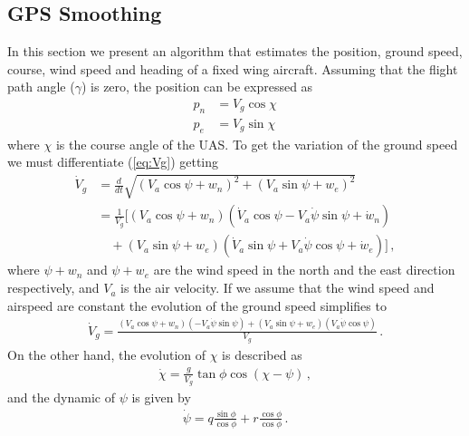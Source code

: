 \subsection{GPS Smoothing}
In this section we present an algorithm that estimates the position, ground speed, course, wind speed and heading of a fixed wing aircraft. Assuming that the flight path angle ($\gamma$) is zero, the position can be expressed as
\begin{align*}
p_n&=V_g\cos\chi\\
p_e&=V_g\sin\chi\,
\end{align*}
where $\chi$ is the course angle of the UAS.
To get the variation of the ground speed we must differentiate (\ref{eq:Vg}) getting
\begin{align*}
\dot{V}_g &= \frac{d}{dt}\sqrt{(V_a\cos\psi+w_n)^2+(V_a\sin\psi+w_e)^2} \\
		  &= \frac{1}{V_g}[(V_a\cos\psi+w_n)(\dot{V}_a\cos\psi-V_a\dot{\psi}\sin\psi+\dot{w}_n)\\
		  & \quad +(V_a\sin\psi+w_e)(\dot{V}_a\sin\psi+V_a\dot{\psi}\cos\psi+\dot{w}_e)]\,,
\end{align*}
where $\psi+w_n$ and $\psi+w_e$ are the wind speed in the north and the east direction respectively, and $V_a$ is the air velocity.
If we assume that the wind speed and airspeed are constant the evolution of the ground speed simplifies to
\begin{align*}
\dot{V}_g=\frac{(V_a\cos\psi+w_n)(-V_a\dot{\psi}\sin\psi)+(V_a\sin\psi+w_e)(V_a\dot{\psi}\cos\psi)}{V_g}\,.
\end{align*}
On the other hand, the evolution of $\chi$ is described as
\begin{align*}
\dot{\chi}=\frac{g}{V_g}\tan\phi\cos(\chi-\psi)\,,
\end{align*}
and the dynamic of $\psi$ is given by
\begin{align*}
\dot{\psi}=q\frac{\sin\phi}{\cos\phi}+r\frac{\cos\phi}{\cos\phi}\,.
\end{align*}

